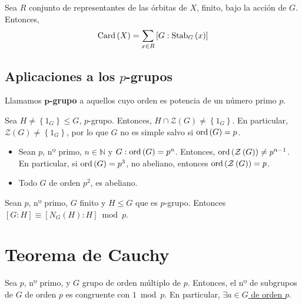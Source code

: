 \begin{coro}
Sea $R$ conjunto de representantes de las órbitas de $X$, finito, bajo la acción de $G$. Entonces,
\[
\operatorname{Card}\left( X \right) = \sum_{x \in R} \left[ G : \mathrm{Stab}_G\left( x \right) \right] 
\]
\end{coro}

\subsection{Aplicaciones a los $p$-grupos}
\begin{defi}
Llamamos $\mathbf{p}$\textbf{-grupo} a aquellos cuyo orden es potencia de un número primo $p$.
\end{defi}
\begin{lema}
Sea $H \neq \left\{ 1_G \right\} \le G$, $p$-grupo. Entonces, $H \cap \mathcal{Z}\left( G \right) \neq \left\{ 1_G \right\}$. En particular, $\mathcal{Z}\left( G \right) \neq \left\{ 1_G \right\}$, por lo que $G$ no es simple salvo si $\operatorname{ord}\left( G \right) = p$.
\end{lema}

\begin{lema}
\begin{itemize}
\item Sean $p$, nº primo, $n \in \mathbb{N}$ y $G: \operatorname{ord}\left( G \right) = p^n$. Entonces, $\operatorname{ord} \left( \mathcal{Z}\left( G \right) \right) \neq p^{n-1}$. En particular, si $\operatorname{ord}\left( G \right) = p^3$, no abeliano, entonces $\operatorname{ord}\left( \mathcal{Z}\left( G \right) \right) = p$.

\item Todo $G$ de orden $p^2$, es abeliano.
\end{itemize} 
\end{lema}

\begin{lema}
Sean $p$, nº primo, $G$ finito y $H \le G$ que es $p$-grupo. Entonces $\left[ G : H \right] \equiv \left[ N_G\left( H \right) : H \right] \bmod p$.
\end{lema}

\section{Teorema de Cauchy}
\begin{theo}[de Cauchy]
Sea $p$, nº primo, y $G$ grupo de orden múltiplo de $p$. Entonces, el nº de subgrupos de $G$ de orden $p$ es congruente con $1 \bmod p$. En particular, \underline{$\exists a \in G$ de orden $p$}. 
\end{theo}
